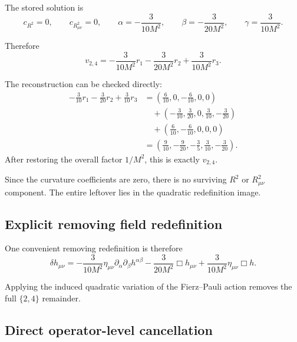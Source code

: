 \documentclass[11pt]{article}
\begin{document}
The stored solution is
\begin{equation}
\boxed{
c_{R^2}=0,\qquad
c_{R_{\mu\nu}^2}=0,\qquad
\alpha=-\frac{3}{10M^2},\qquad
\beta=-\frac{3}{20M^2},\qquad
\gamma=\frac{3}{10M^2}.}
\end{equation}

Therefore
\begin{equation}
v_{2,4}
=
-\frac{3}{10M^2}r_1
-\frac{3}{20M^2}r_2
+\frac{3}{10M^2}r_3.
\end{equation}

The reconstruction can be checked directly:
\begin{align}
-\frac{3}{10}r_1
-\frac{3}{20}r_2
+\frac{3}{10}r_3
&=
\left(
\frac{6}{10},0,-\frac{6}{10},0,0
\right)
\nonumber\\
&\quad+
\left(
-\frac{3}{10},
\frac{3}{20},
0,
\frac{3}{10},
-\frac{3}{20}
\right)
\nonumber\\
&\quad+
\left(
\frac{6}{10},
-\frac{6}{10},
0,0,0
\right)
\nonumber\\
&=
\left(
\frac{9}{10},
-\frac{9}{20},
-\frac35,
\frac{3}{10},
-\frac{3}{20}
\right).
\end{align}
After restoring the overall factor $1/M^2$, this is exactly $v_{2,4}$.

Since the curvature coefficients are zero, there is no surviving $R^2$ or $R_{\mu\nu}^2$ component. The entire leftover lies in the quadratic redefinition image.

\subsection{Explicit removing field redefinition}

One convenient removing redefinition is therefore
\begin{equation}
\boxed{
\delta h_{\mu\nu}
=
-\frac{3}{10M^2}\eta_{\mu\nu}\partial_\alpha\partial_\beta h^{\alpha\beta}
-\frac{3}{20M^2}\Box h_{\mu\nu}
+\frac{3}{10M^2}\eta_{\mu\nu}\Box h.}
\end{equation}

Applying the induced quadratic variation of the Fierz--Pauli action removes the full $\{2,4\}$ remainder.

\subsection{Direct operator-level cancellation}
\end{document}
